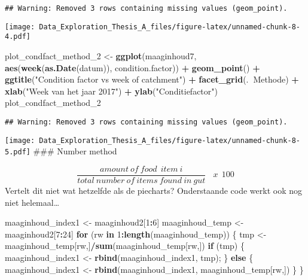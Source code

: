 \documentclass[]{article}
\newenvironment{Shaded}{\begin{snugshade}}{\end{snugshade}}
\newcommand{\KeywordTok}[1]{\textcolor[rgb]{0.13,0.29,0.53}{\textbf{#1}}}
\newcommand{\DecValTok}[1]{\textcolor[rgb]{0.00,0.00,0.81}{#1}}
\newcommand{\StringTok}[1]{\textcolor[rgb]{0.31,0.60,0.02}{#1}}
\newcommand{\ControlFlowTok}[1]{\textcolor[rgb]{0.13,0.29,0.53}{\textbf{#1}}}
\newcommand{\OperatorTok}[1]{\textcolor[rgb]{0.81,0.36,0.00}{\textbf{#1}}}
\newcommand{\NormalTok}[1]{#1}
\begin{document}
\begin{verbatim}
## Warning: Removed 3 rows containing missing values (geom_point).
\end{verbatim}

\texttt{[image: Data\_Exploration\_Thesis\_A\_files/figure-latex/unnamed-chunk-8-4.pdf]}

\begin{Shaded}
\begin{Highlighting}[]
\NormalTok{plot_condfact_method_}\DecValTok{2}\NormalTok{ <-}\StringTok{ }\KeywordTok{ggplot}\NormalTok{(maaginhoud7, }\KeywordTok{aes}\NormalTok{(}\KeywordTok{week}\NormalTok{(}\KeywordTok{as.Date}\NormalTok{(datum)), condition.factor)) }\OperatorTok{+}
\StringTok{  }\KeywordTok{geom_point}\NormalTok{() }\OperatorTok{+}
\StringTok{  }\KeywordTok{ggtitle}\NormalTok{(}\StringTok{"Condition factor vs week of catchment"}\NormalTok{) }\OperatorTok{+}
\StringTok{  }\KeywordTok{facet_grid}\NormalTok{(.}\OperatorTok{~}\NormalTok{Methode) }\OperatorTok{+}
\StringTok{  }\KeywordTok{xlab}\NormalTok{(}\StringTok{"Week van het jaar 2017"}\NormalTok{) }\OperatorTok{+}
\StringTok{  }\KeywordTok{ylab}\NormalTok{(}\StringTok{"Conditiefactor"}\NormalTok{)}
\NormalTok{plot_condfact_method_}\DecValTok{2}
\end{Highlighting}
\end{Shaded}

\begin{verbatim}
## Warning: Removed 3 rows containing missing values (geom_point).
\end{verbatim}

\texttt{[image: Data\_Exploration\_Thesis\_A\_files/figure-latex/unnamed-chunk-8-5.pdf]}
\#\#\# Number method

\[ \frac{amount~of~food~~item~i}{total~number~of~items~found~in~gut}~~~~ x ~~ 100  \]
Vertelt dit niet wat hetzelfde als de piecharts? Onderstaande code werkt
ook nog niet helemaal\ldots{}

\begin{Shaded}
\begin{Highlighting}[]
\NormalTok{maaginhoud_index1  <-}\StringTok{ }\NormalTok{maaginhoud2[}\DecValTok{1}\OperatorTok{:}\DecValTok{6}\NormalTok{]}
\NormalTok{maaginhoud_temp <-}\StringTok{ }\NormalTok{maaginhoud2[}\DecValTok{7}\OperatorTok{:}\DecValTok{24}\NormalTok{]}
\ControlFlowTok{for}\NormalTok{ (rw }\ControlFlowTok{in} \DecValTok{1}\OperatorTok{:}\KeywordTok{length}\NormalTok{(maaginhoud_temp)) \{ }
\NormalTok{    tmp <-}\StringTok{ }\NormalTok{maaginhoud_temp[rw,]}\OperatorTok{/}\KeywordTok{sum}\NormalTok{(maaginhoud_temp[rw,]) }
    \ControlFlowTok{if}\NormalTok{ (tmp) \{}
\NormalTok{          maaginhoud_index1 <-}\StringTok{ }\KeywordTok{rbind}\NormalTok{(maaginhoud_index1, tmp); }
\NormalTok{    \} }\ControlFlowTok{else}\NormalTok{ \{}
\NormalTok{      maaginhoud_index1 <-}\StringTok{ }\KeywordTok{rbind}\NormalTok{(maaginhoud_index1, maaginhoud_temp[rw,])}
\NormalTok{    \}}
\NormalTok{\} }
\end{Highlighting}
\end{Shaded}
\end{document}
